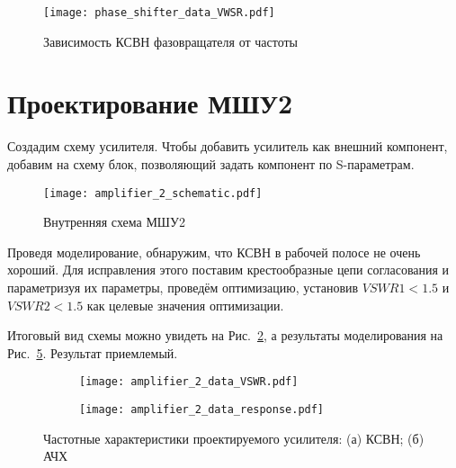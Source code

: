 \begin{figure}[!ht]
    \centering
    \texttt{[image: phase\_shifter\_data\_VWSR.pdf]}
    \caption{Зависимость КСВН фазовращателя от частоты}%
    \label{fig:phase_shifter_data_VWSR}
\end{figure}

\section{Проектирование МШУ2}

Создадим схему усилителя.
Чтобы добавить усилитель как внешний компонент, добавим на схему блок, позволяющий задать компонент по S-параметрам.

\begin{figure}[!ht]
    \centering
    \texttt{[image: amplifier\_2\_schematic.pdf]}
    \caption{Внутренняя схема МШУ2}%
    \label{fig:amplifier_2_schematic}
\end{figure}

Проведя моделирование, обнаружим, что КСВН в рабочей полосе не очень хороший.
Для исправления этого поставим крестообразные цепи согласования и параметризуя их параметры, проведём оптимизацию, установив $VSWR1 < 1.5$ и $VSWR2 < 1.5$ как целевые значения оптимизации.

Итоговый вид схемы можно увидеть на Рис.~\ref{fig:amplifier_2_schematic}, а результаты моделирования на Рис.~\ref{fig:amplifier_2_data}.
Результат приемлемый.

\begin{figure}[!ht]
    \centering
    \begin{subfigure}[b]{0.45\textwidth}
        \centering
        \texttt{[image: amplifier\_2\_data\_VSWR.pdf]}
        \caption{}%
        \label{fig:amplifier_2_data_VSWR}
    \end{subfigure}
    \hfill
    \begin{subfigure}[b]{0.45\textwidth}
        \centering
        \texttt{[image: amplifier\_2\_data\_response.pdf]}
        \caption{}%
        \label{fig:amplifier_2_data_response}
    \end{subfigure}
    \caption{%
        Частотные характеристики проектируемого усилителя:
        (а) КСВН;
        (б) АЧХ
    }%
    \label{fig:amplifier_2_data}
\end{figure}


